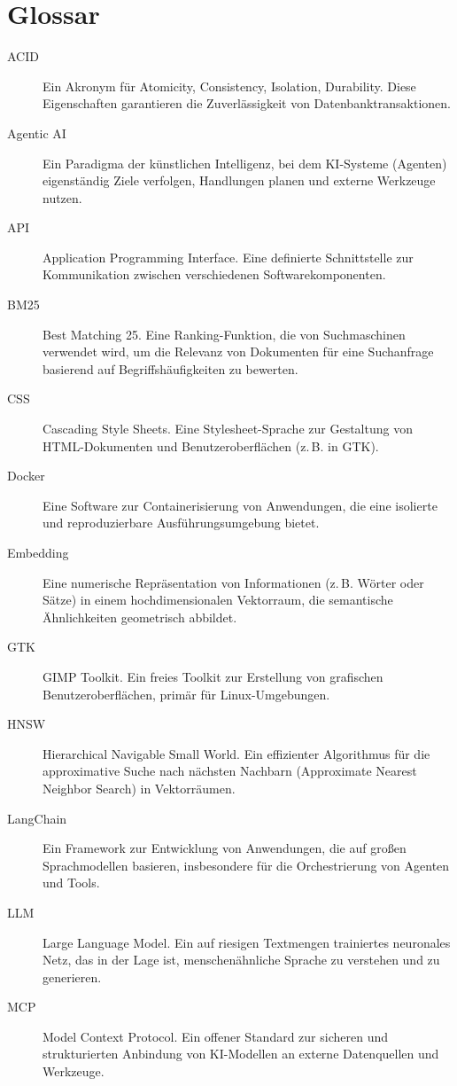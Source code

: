 \chapter*{Glossar}

\begin{description}
    \item[ACID] Ein Akronym für Atomicity, Consistency, Isolation, Durability. Diese Eigenschaften garantieren die Zuverlässigkeit von Datenbanktransaktionen.
    \item[Agentic AI] Ein Paradigma der künstlichen Intelligenz, bei dem KI-Systeme (Agenten) eigenständig Ziele verfolgen, Handlungen planen und externe Werkzeuge nutzen.
    \item[API] Application Programming Interface. Eine definierte Schnittstelle zur Kommunikation zwischen verschiedenen Softwarekomponenten.
    \item[BM25] Best Matching 25. Eine Ranking-Funktion, die von Suchmaschinen verwendet wird, um die Relevanz von Dokumenten für eine Suchanfrage basierend auf Begriffshäufigkeiten zu bewerten.
    \item[CSS] Cascading Style Sheets. Eine Stylesheet-Sprache zur Gestaltung von HTML-Dokumenten und Benutzeroberflächen (z.\,B. in GTK).
    \item[Docker] Eine Software zur Containerisierung von Anwendungen, die eine isolierte und reproduzierbare Ausführungsumgebung bietet.
    \item[Embedding] Eine numerische Repräsentation von Informationen (z.\,B. Wörter oder Sätze) in einem hochdimensionalen Vektorraum, die semantische Ähnlichkeiten geometrisch abbildet.
    \item[GTK] GIMP Toolkit. Ein freies Toolkit zur Erstellung von grafischen Benutzeroberflächen, primär für Linux-Umgebungen.
    \item[HNSW] Hierarchical Navigable Small World. Ein effizienter Algorithmus für die approximative Suche nach nächsten Nachbarn (Approximate Nearest Neighbor Search) in Vektorräumen.
    \item[LangChain] Ein Framework zur Entwicklung von Anwendungen, die auf großen Sprachmodellen basieren, insbesondere für die Orchestrierung von Agenten und Tools.
    \item[LLM] Large Language Model. Ein auf riesigen Textmengen trainiertes neuronales Netz, das in der Lage ist, menschenähnliche Sprache zu verstehen und zu generieren.
    \item[MCP] Model Context Protocol. Ein offener Standard zur sicheren und strukturierten Anbindung von KI-Modellen an externe Datenquellen und Werkzeuge.

\end{description}
